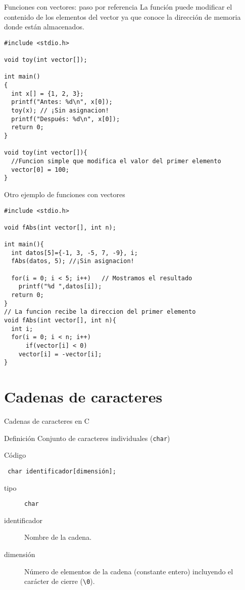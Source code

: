 \documentclass[xcolor={usenames,svgnames,dvipsnames}, aspectratio=169]{beamer}
\begin{document}
\begin{frame}[label={sec:orgf672380},fragile,plain]{Funciones con vectores: paso por referencia}
 La función \alert{puede modificar} el contenido de los elementos del vector ya que conoce la dirección de memoria donde están almacenados.

\lstset{language=C,label= ,caption= ,captionpos=b,numbers=none}
\begin{lstlisting}
#include <stdio.h>

void toy(int vector[]);

int main()
{
  int x[] = {1, 2, 3};
  printf("Antes: %d\n", x[0]);
  toy(x); // ¡Sin asignacion!
  printf("Después: %d\n", x[0]);
  return 0;
}

void toy(int vector[]){ 
  //Funcion simple que modifica el valor del primer elemento
  vector[0] = 100;
}
\end{lstlisting}
\end{frame}

\begin{frame}[label={sec:orgb2081d7},fragile,plain]{Otro ejemplo de funciones con vectores}
 \lstset{language=C,label= ,caption= ,captionpos=b,numbers=none}
\begin{lstlisting}
#include <stdio.h>

void fAbs(int vector[], int n);

int main(){
  int datos[5]={-1, 3, -5, 7, -9}, i;
  fAbs(datos, 5); //¡Sin asignacion!

  for(i = 0; i < 5; i++)   // Mostramos el resultado
    printf("%d ",datos[i]);
  return 0;
}
// La funcion recibe la direccion del primer elemento
void fAbs(int vector[], int n){
  int i;
  for(i = 0; i < n; i++)
      if(vector[i] < 0)
	vector[i] = -vector[i];
}
\end{lstlisting}
\end{frame}

\section{Cadenas de caracteres}
\label{sec:orgc4bf7db}
\begin{frame}[label={sec:orgb3c6cda},fragile]{Cadenas de caracteres en C}
 \begin{block}{Definición}
Conjunto de caracteres individuales (\texttt{char})
\end{block}
\begin{block}{Código}
\lstset{language=C,label= ,caption= ,captionpos=b,numbers=none}
\begin{lstlisting}
 char identificador[dimensión];
\end{lstlisting}

\begin{description}
\item[{tipo}] \texttt{char}
\item[{identificador}] Nombre de la cadena.
\item[{dimensión}] Número de elementos de la cadena (constante entero) \alert{incluyendo el carácter de cierre} (\texttt{\textbackslash{}0}).
\end{description}
\end{block}
\end{frame}
\end{document}
